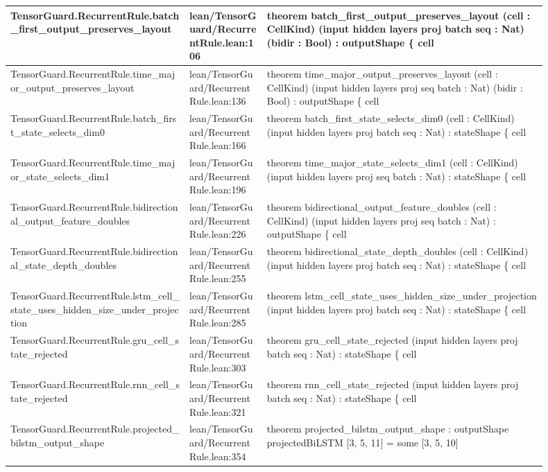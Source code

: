 \documentclass[10pt]{article}
\begin{document}
\begin{longtable}{|p{0.30\linewidth}|p{0.13\linewidth}|p{0.47\linewidth}|}
\hline
TensorGuard.RecurrentRule.batch\_first\_output\_preserves\_layout & lean/TensorGuard/RecurrentRule.lean:106 & theorem batch\_first\_output\_preserves\_layout (cell : CellKind) (input hidden layers proj batch seq : Nat) (bidir : Bool) : outputShape \{ cell \\
\hline
TensorGuard.RecurrentRule.time\_major\_output\_preserves\_layout & lean/TensorGuard/RecurrentRule.lean:136 & theorem time\_major\_output\_preserves\_layout (cell : CellKind) (input hidden layers proj seq batch : Nat) (bidir : Bool) : outputShape \{ cell \\
\hline
TensorGuard.RecurrentRule.batch\_first\_state\_selects\_dim0 & lean/TensorGuard/RecurrentRule.lean:166 & theorem batch\_first\_state\_selects\_dim0 (cell : CellKind) (input hidden layers proj batch seq : Nat) : stateShape \{ cell \\
\hline
TensorGuard.RecurrentRule.time\_major\_state\_selects\_dim1 & lean/TensorGuard/RecurrentRule.lean:196 & theorem time\_major\_state\_selects\_dim1 (cell : CellKind) (input hidden layers proj seq batch : Nat) : stateShape \{ cell \\
\hline
TensorGuard.RecurrentRule.bidirectional\_output\_feature\_doubles & lean/TensorGuard/RecurrentRule.lean:226 & theorem bidirectional\_output\_feature\_doubles (cell : CellKind) (input hidden layers proj seq batch : Nat) : outputShape \{ cell \\
\hline
TensorGuard.RecurrentRule.bidirectional\_state\_depth\_doubles & lean/TensorGuard/RecurrentRule.lean:255 & theorem bidirectional\_state\_depth\_doubles (cell : CellKind) (input hidden layers proj batch seq : Nat) : stateShape \{ cell \\
\hline
TensorGuard.RecurrentRule.lstm\_cell\_state\_uses\_hidden\_size\_under\_projection & lean/TensorGuard/RecurrentRule.lean:285 & theorem lstm\_cell\_state\_uses\_hidden\_size\_under\_projection (input hidden layers proj batch seq : Nat) : stateShape \{ cell \\
\hline
TensorGuard.RecurrentRule.gru\_cell\_state\_rejected & lean/TensorGuard/RecurrentRule.lean:303 & theorem gru\_cell\_state\_rejected (input hidden layers proj batch seq : Nat) : stateShape \{ cell \\
\hline
TensorGuard.RecurrentRule.rnn\_cell\_state\_rejected & lean/TensorGuard/RecurrentRule.lean:321 & theorem rnn\_cell\_state\_rejected (input hidden layers proj batch seq : Nat) : stateShape \{ cell \\
\hline
TensorGuard.RecurrentRule.projected\_bilstm\_output\_shape & lean/TensorGuard/RecurrentRule.lean:354 & theorem projected\_bilstm\_output\_shape : outputShape projectedBiLSTM [3, 5, 11] = some [3, 5, 10] \\

\end{longtable}
\end{document}
